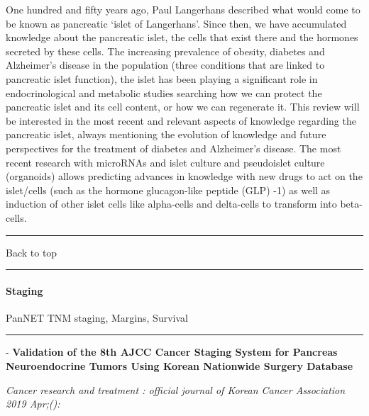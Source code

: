 \documentclass[]{article}
\let\oldparagraph\paragraph
\renewcommand{\paragraph}[1]{\oldparagraph{#1}\mbox{}}
\begin{document}
One hundred and fifty years ago, Paul Langerhans described what would
come to be known as pancreatic `islet of Langerhans'. Since then, we
have accumulated knowledge about the pancreatic islet, the cells that
exist there and the hormones secreted by these cells. The increasing
prevalence of obesity, diabetes and Alzheimer's disease in the
population (three conditions that are linked to pancreatic islet
function), the islet has been playing a significant role in
endocrinological and metabolic studies searching how we can protect the
pancreatic islet and its cell content, or how we can regenerate it. This
review will be interested in the most recent and relevant aspects of
knowledge regarding the pancreatic islet, always mentioning the
evolution of knowledge and future perspectives for the treatment of
diabetes and Alzheimer's disease. The most recent research with
microRNAs and islet culture and pseudoislet culture (organoids) allows
predicting advances in knowledge with new drugs to act on the
islet/cells (such as the hormone glucagon-like peptide (GLP) -1) as well
as induction of other islet cells like alpha-cells and delta-cells to
transform into beta-cells.

{}

{}

\begin{center}\rule{0.5\linewidth}{\linethickness}\end{center}

Back to top

\begin{center}\rule{0.5\linewidth}{\linethickness}\end{center}

\pagebreak

\hypertarget{staging-3}{%
\paragraph{Staging}\label{staging-3}}

PanNET TNM staging, Margins, Survival

\begin{center}\rule{0.5\linewidth}{\linethickness}\end{center}

 - \textbf{Validation of the 8th AJCC Cancer Staging System for Pancreas
Neuroendocrine Tumors Using Korean Nationwide Surgery Database}

\emph{Cancer research and treatment : official journal of Korean Cancer
Association 2019 Apr;():}
\end{document}
